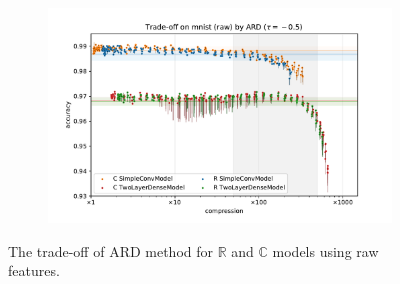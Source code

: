 \documentclass[a4paper,10pt]{article}
\newcommand{\real}{\mathbb{R}}
\newcommand{\cplx}{\mathbb{C}}
\begin{document}
\begin{figure}[b]
\begin{subfigure}[b]{0.5\textwidth}
  \end{subfigure}%
  \begin{subfigure}[b]{0.5\textwidth}
    \centering
    \includegraphics[width=\linewidth]{figure__mnist-like__trade-off/appendix__ARD__mnist__raw__-0.5.pdf}
  \end{subfigure}
  \caption{%
    The trade-off of ARD method for $\real$ and $\cplx$ models using raw features.
  }
  \label{fig:appendix__mnist-like__trade-off__ARD__raw}
\end{figure}
\end{document}
